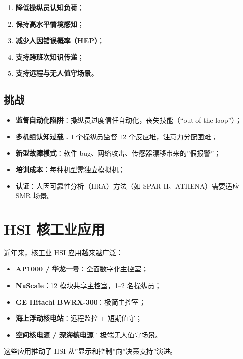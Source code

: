 \documentclass[
  UTF8,
  scheme=plain,
  fontsize=10pt,
  openany
]{ctexbook}
\begin{document}
\begin{enumerate}
\def\labelenumi{\arabic{enumi}.}
\tightlist
\item
  \textbf{降低操纵员认知负荷}；
\item
  \textbf{保持高水平情境感知}；
\item
  \textbf{减少人因错误概率（HEP）}；
\item
  \textbf{支持跨班次知识传递}；
\item
  \textbf{支持远程与无人值守场景}。
\end{enumerate}

\subsection{挑战}\label{ux6311ux6218-2}

\begin{itemize}
\tightlist
\item
  \textbf{监督自动化陷阱}：操纵员过度信任自动化，丧失技能（``out-of-the-loop''）；
\item
  \textbf{多机组认知过载}：1 个操纵员监督 12 个反应堆，注意力分配困难；
\item
  \textbf{新型故障模式}：软件
  bug、网络攻击、传感器漂移带来的''假报警''；
\item
  \textbf{培训成本}：每种机型需独立模拟机；
\item
  \textbf{认证}：人因可靠性分析（HRA）方法（如 SPAR-H、ATHENA）需要适应
  SMR 场景。
\end{itemize}

\section{HSI 核工业应用}\label{hsi-ux6838ux5de5ux4e1aux5e94ux7528}

近年来，核工业 HSI 应用越来越广泛：

\begin{itemize}
\tightlist
\item
  \textbf{AP1000 / 华龙一号}：全面数字化主控室；
\item
  \textbf{NuScale}：12 模块共享主控室，1--2 名操纵员；
\item
  \textbf{GE Hitachi BWRX-300}：极简主控室；
\item
  \textbf{海上浮动核电站}：远程监控 + 短期值守；
\item
  \textbf{空间核电源 / 深海核电源}：极端无人值守场景。
\end{itemize}

这些应用推动了 HSI 从''显示和控制''向''决策支持''演进。
\end{document}
